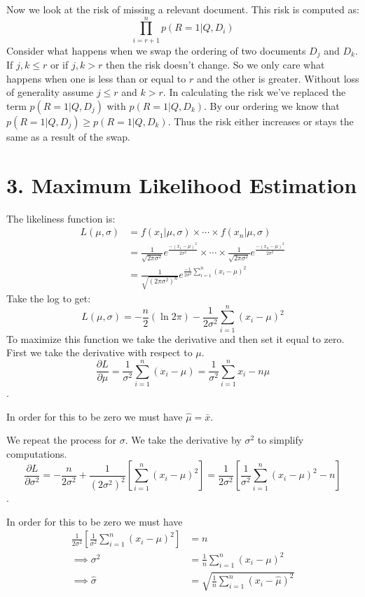 \documentclass[paper=a4, fontsize=11pt]{jhwhw} %
\begin{document}
Now we look at the risk of missing a relevant document. This risk is computed as:
$$\prod_{i=r+1}^{n} p(R = 1|Q, D_i)$$
Consider what happens when we swap the ordering of two documents $D_j$ and $D_k$. If $j, k \le r$ or if $j, k > r$ then the risk doesn't change. So we only care what happens when one is less than or equal to $r$ and the other is greater. Without loss of generality assume $j \le r$ and $k > r$. In calculating the risk we've replaced the term $p(R = 1|Q, D_j)$ with $p(R = 1| Q, D_k)$. By our ordering we know that $p(R = 1|Q, D_j) \ge p(R = 1|Q, D_k)$. Thus the risk either increases or stays the same as a result of the swap.
\section*{3. Maximum Likelihood Estimation}
\solution
The likeliness function is:
\begin{align*}
    L(\mu, \sigma) &= f(x_1|\mu, \sigma) \times \cdots \times f(x_n|\mu, \sigma)\\
                   &= \frac{1}{\sqrt{2\pi\sigma^2}}e^{\frac{-(x_1 - \mu)^2}{2\sigma^2}} \times \cdots \times \frac{1}{\sqrt{2\pi\sigma^2}}e^{\frac{-(x_n - \mu)^2}{2\sigma^2}}\\
                   &= \frac{1}{\sqrt{(2\pi\sigma^2)^n}}e^{\frac{-1}{2\sigma^2}\sum_{i=1}^{n}(x_i - \mu)^2}
\end{align*}
Take the log to get:
$$L(\mu, \sigma) = -\frac{n}{2}(\ln{2\pi}) - \frac{1}{2\sigma^2}\sum_{i=1}^{n}(x_i - \mu)^2$$
To maximize this function we take the derivative and then set it equal to zero. First we take the derivative with respect to $\mu$. 
$$\frac{\partial L}{\partial \mu} = \frac{1}{\sigma^2}\sum_{i=1}^{n}(x_i - \mu) = \frac{1}{\sigma^2}\sum_{i=1}^{n}x_i - n\mu$$.

In order for this to be zero we must have $\hat\mu = \bar{x}$.

We repeat the process for $\sigma$. We take the derivative by $\sigma^2$ to simplify computations. 
$$\frac{\partial L}{\partial \sigma^2} = -\frac{n}{2\sigma^2} + \frac{1}{(2\sigma^2)^2}[\sum_{i=1}^{n}(x_i - \mu)^2] = \frac{1}{2\sigma^2}[\frac{1}{\sigma^2}\sum_{i=1}^{n}(x_i - \mu)^2 - n]$$.

In order for this to be zero we must have
\begin{align*}
    \frac{1}{2\sigma^2}[\frac{1}{\sigma^2}\sum_{i=1}^{n}(x_i - \mu)^2] &= n\\
    \implies \sigma^2 &= \frac{1}{n}\sum_{i=1}^{n}(x_i - \mu)^2\\
    \implies \hat\sigma &= \sqrt{\frac{1}{n}\sum_{i=1}^{n}(x_i - \hat\mu)^2}
\end{align*}
\end{document}
